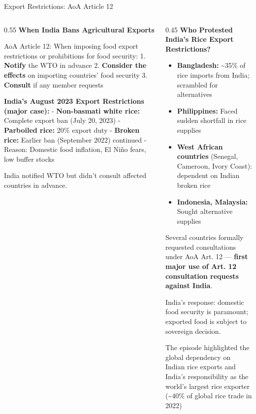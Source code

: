 \documentclass[
  ignorenonframetext,
  aspectratio=169,
]{beamer}
\makeatletter
\providecommand{\tightlist}{%
  \setlength{\itemsep}{0pt}\setlength{\parskip}{0pt}}
\let\quarto@originallabel\label
\DeclareRobustCommand*{\label}[1]{\quarto@originallabel{#1}}
\makeatother
\begin{document}
\begin{frame}{Export Restrictions: AoA Article 12}
\label{export-restrictions-aoa-article-12}
\begin{columns}[T]
\begin{column}{0.55\linewidth}
\textbf{When India Bans Agricultural Exports}

AoA Article 12: When imposing food export restrictions or prohibitions
for food security: 1. \textbf{Notify} the WTO in advance 2.
\textbf{Consider the effects} on importing countries' food security 3.
\textbf{Consult} if any member requests

\textbf{India's August 2023 Export Restrictions (major case):} -
\textbf{Non-basmati white rice:} Complete export ban (July 20, 2023) -
\textbf{Parboiled rice:} 20\% export duty - \textbf{Broken rice:}
Earlier ban (September 2022) continued - Reason: Domestic food
inflation, El Niño fears, low buffer stocks

India notified WTO but didn't consult affected countries in advance.
\end{column}

\begin{column}{0.45\linewidth}
\textbf{Who Protested India's Rice Export Restrictions?}

\begin{itemize}
\tightlist
\item
  \textbf{Bangladesh:} \textasciitilde35\% of rice imports from India;
  scrambled for alternatives
\item
  \textbf{Philippines:} Faced sudden shortfall in rice supplies
\item
  \textbf{West African countries} (Senegal, Cameroon, Ivory Coast):
  dependent on Indian broken rice
\item
  \textbf{Indonesia, Malaysia:} Sought alternative supplies
\end{itemize}

Several countries formally requested consultations under AoA Art. 12 ---
\textbf{first major use of Art. 12 consultation requests against India}.

India's response: domestic food security is paramount; exported food is
subject to sovereign decision.

The episode highlighted the global dependency on Indian rice exports and
India's responsibility as the world's largest rice exporter
(\textasciitilde40\% of global rice trade in 2022)
\end{column}
\end{columns}
\end{frame}
\end{document}
